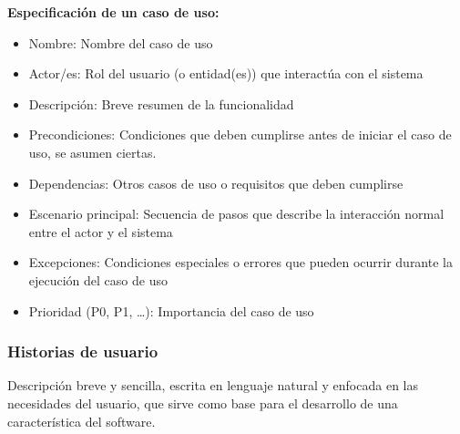     \begin{exemplo}
        \textbf{Especificación de un caso de uso:}

        \begin{itemize}

            \item Nombre: Nombre del caso de uso

            \item Actor/es: Rol del usuario (o entidad(es)) que interactúa con el sistema

            \item Descripción: Breve resumen de la funcionalidad

            \item Precondiciones: Condiciones que deben cumplirse antes de iniciar el caso de uso, se asumen ciertas.

            \item Dependencias: Otros casos de uso o requisitos que deben cumplirse

            \item Escenario principal: Secuencia de pasos que describe la interacción normal entre el actor y el sistema

            \item Excepciones: Condiciones especiales o errores que pueden ocurrir durante la ejecución del caso de uso

            \item Prioridad (P0, P1, \ldots): Importancia del caso de uso

        \end{itemize}
    \end{exemplo}

    \subsubsection*{Historias de usuario}

    \begin{definicion}
        Descripción breve y sencilla, escrita en lenguaje natural y enfocada en
        las necesidades del usuario, que sirve como base para el desarrollo de
        una característica del software.
    \end{definicion}

    \begin{exemplo}

        \textit{}
    \end{exemplo}

